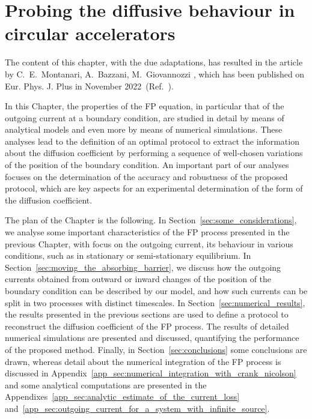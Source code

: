 \chapter{Probing the diffusive behaviour in circular accelerators}

\noindent\textsf{The content of this chapter, with the due adaptations, has resulted in the article by C.\ E.\ Montanari, A.\ Bazzani, M.\ Giovannozzi \textit{}, which has been published on Eur. Phys. J. Plus in November 2022~(Ref.~\cite{our_paper9}).}

In this Chapter, the properties of the FP equation, in particular that of the outgoing current at a boundary condition, are studied in detail by means of analytical models and even more by means of numerical simulations. These analyses lead to the definition of an optimal protocol to extract the information about the diffusion coefficient by performing a sequence of well-chosen variations of the position of the boundary condition. An important part of our {analyses focuses} on the determination of the accuracy and robustness of the proposed protocol, {which are key aspects for an experimental determination of the form of the diffusion coefficient}.

The plan of the Chapter is the following. In Section~\ref{sec:some_considerations}, we analyse some important characteristics of the FP process presented in the previous Chapter, with focus on the outgoing current, its behaviour in various conditions, such as in stationary or semi-stationary equilibrium. In Section~\ref{sec:moving_the_absorbing_barrier}, we discuss how the outgoing currents obtained from outward or inward changes of the position of the boundary condition can be described by our model, and how such currents can be split in two processes with distinct timescales. In Section~\ref{sec:numerical_results}, the results presented in the previous sections are used to define a protocol to reconstruct the diffusion coefficient of the FP process. The results of detailed numerical simulations are presented and discussed, quantifying the performance of the proposed method. Finally, in Section~\ref{sec:conclusions} some conclusions are drawn, whereas detail about the numerical integration of the FP process is discussed in Appendix~\ref{app_sec:numerical_integration_with_crank_nicolson} and some analytical computations are presented in the Appendixes~\ref{app_sec:analytic_estimate_of_the_current_loss} and~\ref{app_sec:outgoing_current_for_a_system_with_infinite_source}.

